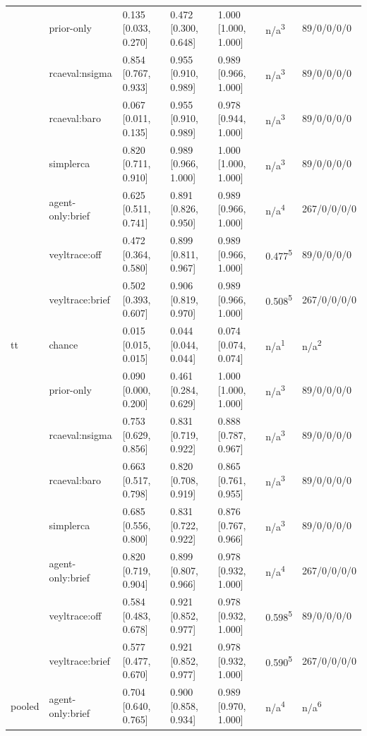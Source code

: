 \begin{table}[t]
\begin{tabular}{@{}lllllll@{}}
 & prior-only & 0.135 [0.033, 0.270] & 0.472 [0.300, 0.648] & 1.000 [1.000, 1.000] & n/a\textsuperscript{3} & 89/0/0/0/0 \\
 & rcaeval:nsigma & 0.854 [0.767, 0.933] & 0.955 [0.910, 0.989] & 0.989 [0.966, 1.000] & n/a\textsuperscript{3} & 89/0/0/0/0 \\
 & rcaeval:baro & 0.067 [0.011, 0.135] & 0.955 [0.910, 0.989] & 0.978 [0.944, 1.000] & n/a\textsuperscript{3} & 89/0/0/0/0 \\
 & simplerca & 0.820 [0.711, 0.910] & 0.989 [0.966, 1.000] & 1.000 [1.000, 1.000] & n/a\textsuperscript{3} & 89/0/0/0/0 \\
 & agent-only:brief & 0.625 [0.511, 0.741] & 0.891 [0.826, 0.950] & 0.989 [0.966, 1.000] & n/a\textsuperscript{4} & 267/0/0/0/0 \\
 & veyltrace:off & 0.472 [0.364, 0.580] & 0.899 [0.811, 0.967] & 0.989 [0.966, 1.000] & 0.477\textsuperscript{5} & 89/0/0/0/0 \\
 & veyltrace:brief & 0.502 [0.393, 0.607] & 0.906 [0.819, 0.970] & 0.989 [0.966, 1.000] & 0.508\textsuperscript{5} & 267/0/0/0/0 \\
tt & chance & 0.015 [0.015, 0.015] & 0.044 [0.044, 0.044] & 0.074 [0.074, 0.074] & n/a\textsuperscript{1} & n/a\textsuperscript{2} \\
 & prior-only & 0.090 [0.000, 0.200] & 0.461 [0.284, 0.629] & 1.000 [1.000, 1.000] & n/a\textsuperscript{3} & 89/0/0/0/0 \\
 & rcaeval:nsigma & 0.753 [0.629, 0.856] & 0.831 [0.719, 0.922] & 0.888 [0.787, 0.967] & n/a\textsuperscript{3} & 89/0/0/0/0 \\
 & rcaeval:baro & 0.663 [0.517, 0.798] & 0.820 [0.708, 0.919] & 0.865 [0.761, 0.955] & n/a\textsuperscript{3} & 89/0/0/0/0 \\
 & simplerca & 0.685 [0.556, 0.800] & 0.831 [0.722, 0.922] & 0.876 [0.767, 0.966] & n/a\textsuperscript{3} & 89/0/0/0/0 \\
 & agent-only:brief & 0.820 [0.719, 0.904] & 0.899 [0.807, 0.966] & 0.978 [0.932, 1.000] & n/a\textsuperscript{4} & 267/0/0/0/0 \\
 & veyltrace:off & 0.584 [0.483, 0.678] & 0.921 [0.852, 0.977] & 0.978 [0.932, 1.000] & 0.598\textsuperscript{5} & 89/0/0/0/0 \\
 & veyltrace:brief & 0.577 [0.477, 0.670] & 0.921 [0.852, 0.977] & 0.978 [0.932, 1.000] & 0.590\textsuperscript{5} & 267/0/0/0/0 \\
pooled & agent-only:brief & 0.704 [0.640, 0.765] & 0.900 [0.858, 0.934] & 0.989 [0.970, 1.000] & n/a\textsuperscript{4} & n/a\textsuperscript{6} \\

\end{tabular}
\end{table}
